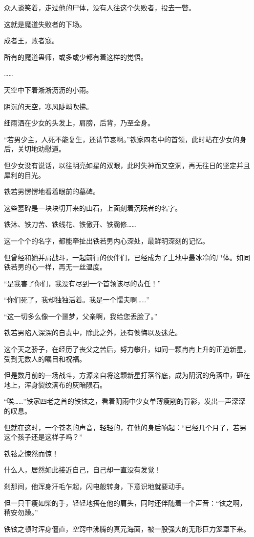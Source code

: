 \begin{this_body}
众人谈笑着，走过他的尸体，没有人往这个失败者，投去一瞥。

这就是魔道失败者的下场。

成者王，败者寇。

所有的魔道蛊师，或多或少都有着这样的觉悟。

……

天空中下着淅淅沥沥的小雨。

阴沉的天空，寒风陡峭吹拂。

细雨洒在少女的头发上，肩膀，后背，乃至全身。

“若男少主，人死不能复生，还请节哀啊。”铁家四老中的首领，此时站在少女的身后，关切地劝慰道。

但少女没有说话，以往明亮如星的双眼，此时失神而又空洞，再无往日的坚定并且犀利的目光。

铁若男愣愣地看着眼前的墓碑。

这些墓碑是一块块切开来的山石，上面刻着沉眠者的名字。

铁沐、铁刀苦、铁线花、铁傲开、铁霸修……

这一个个的名字，都能牵扯出铁若男内心深处，最鲜明深刻的记忆。

但曾经和她并肩战斗，一起前行的伙伴们，已经成为了土地中最冰冷的尸体。如同铁若男的心一样，再无一丝温度。

“是我害了你们，我没有尽到一个首领该尽的责任！”

“你们死了，我却独独活着。我是一个懦夫啊……”

“这一切多么像一个噩梦，父亲啊，我给您丢脸了。”

铁若男陷入深深的自责中，除此之外，还有懊悔以及迷茫。

这个天之骄子，在经历了丧父之苦后，努力攀升，如同一颗冉冉上升的正道新星，受到无数人的瞩目和祝福。

但是数月前的一场战斗，方源亲自将这颗新星打落谷底，成为阴沉的角落中，砸在地上，浑身裂纹满布的灰暗陨石。

“唉……”铁家四老之首的铁铉之，看着阴雨中少女单薄瘦削的背影，发出一声深深的叹息。

但就在这时，一个苍老的声音，轻轻的，在他的身后响起：“已经几个月了，若男这个孩子还是这样子吗？”

铁铉之悚然而惊！

什么人，居然如此接近自己，自己却一直没有发觉！

刹那间，他浑身汗毛乍起，闪电般转身，下意识地就要动手。

但一只干瘦如柴的手，轻轻地搭在他的肩头，同时还伴随着一个声音：“铉之啊，稍安勿躁。”

铁铉之顿时浑身僵直，空窍中沸腾的真元海面，被一股强大的无形巨力笼罩下来。


\end{this_body}
